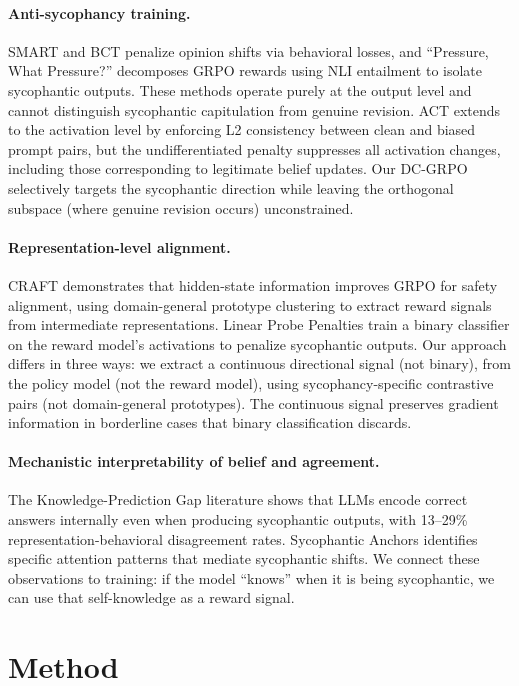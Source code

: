\documentclass[11pt]{article}
\begin{document}
\paragraph{Anti-sycophancy training.}
SMART and BCT penalize opinion shifts via behavioral losses, and ``Pressure, What Pressure?'' decomposes GRPO rewards using NLI entailment to isolate sycophantic outputs. These methods operate purely at the output level and cannot distinguish sycophantic capitulation from genuine revision. ACT extends to the activation level by enforcing L2 consistency between clean and biased prompt pairs, but the undifferentiated penalty suppresses all activation changes, including those corresponding to legitimate belief updates. Our DC-GRPO selectively targets the sycophantic direction while leaving the orthogonal subspace (where genuine revision occurs) unconstrained.

\paragraph{Representation-level alignment.}
CRAFT demonstrates that hidden-state information improves GRPO for safety alignment, using domain-general prototype clustering to extract reward signals from intermediate representations. Linear Probe Penalties train a binary classifier on the reward model's activations to penalize sycophantic outputs. Our approach differs in three ways: we extract a continuous directional signal (not binary), from the policy model (not the reward model), using sycophancy-specific contrastive pairs (not domain-general prototypes). The continuous signal preserves gradient information in borderline cases that binary classification discards.

\paragraph{Mechanistic interpretability of belief and agreement.}
The Knowledge-Prediction Gap literature shows that LLMs encode correct answers internally even when producing sycophantic outputs, with 13--29\% representation-behavioral disagreement rates. Sycophantic Anchors identifies specific attention patterns that mediate sycophantic shifts. We connect these observations to training: if the model ``knows'' when it is being sycophantic, we can use that self-knowledge as a reward signal.

\section{Method}
\label{sec:method}
\end{document}
